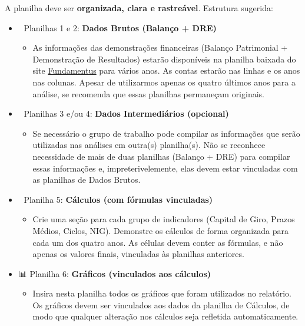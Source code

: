 \documentclass[
  a4paper,
]{book}
\providecommand{\tightlist}{%
  \setlength{\itemsep}{0pt}\setlength{\parskip}{0pt}}\usepackage{longtable,booktabs,array}
\newcommand{\emojitext}[1]{{\emoji #1}}
\begin{document}
A planilha deve ser \textbf{organizada, clara e rastreável}. Estrutura
sugerida:

\begin{itemize}
\tightlist
\item
  \emojitext{📂} Planilhas 1 e 2: \textbf{Dados Brutos (Balanço + DRE)}

  \begin{itemize}
  \tightlist
  \item
    As informações das demonstrações financeiras (Balanço Patrimonial +
    Demonstração de Resultados) estarão disponíveis na planilha baixada
    do site \href{https://www.fundamentus.com.br}{Fundamentus} para
    vários anos. As contas estarão nas linhas e os anos nas colunas.
    Apesar de utilizarmos apenas os quatro últimos anos para a análise,
    se recomenda que essas planilhas permaneçam originais.\\
  \end{itemize}
\item
  \emojitext{📂} Planilhas 3 e/ou 4: \textbf{Dados Intermediários
  (opcional)}

  \begin{itemize}
  \tightlist
  \item
    Se necessário o grupo de trabalho pode compilar as informações que
    serão utilizadas nas análises em outra(s) planilha(s). Não se
    reconhece necessidade de mais de duas planilhas (Balanço + DRE) para
    compilar essas informações e, impreterivelemente, elas devem estar
    vinculadas com as planilhas de Dados Brutos.\\
  \end{itemize}
\item
  \emojitext{📂} Planilha 5: \textbf{Cálculos (com fórmulas vinculadas)}

  \begin{itemize}
  \tightlist
  \item
    Crie uma seção para cada grupo de indicadores (Capital de Giro,
    Prazos Médios, Ciclos, NIG). Demonstre os cálculos de forma
    organizada para cada um dos quatro anos. As células devem conter as
    fórmulas, e não apenas os valores finais, vinculadas às planilhas
    anteriores.\\
  \end{itemize}
\item
  \emojitext{📊} Planilha 6: \textbf{Gráficos (vinculados aos cálculos)}

  \begin{itemize}
  \tightlist
  \item
    Insira nesta planilha todos os gráficos que foram utilizados no
    relatório. Os gráficos devem ser vinculados aos dados da planilha de
    Cálculos, de modo que qualquer alteração nos cálculos seja refletida
    automaticamente.
  \end{itemize}
\end{itemize}
\end{document}
